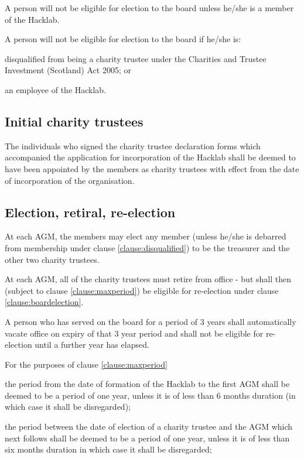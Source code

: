 \documentclass{article}
\newcommand{\charityact}{Charities and Trustee Investment (Scotland) Act 2005}
\begin{document}
\clause A person will not be eligible for election to the board unless
he/she is a member of the Hacklab.

\clause A person will not be eligible for election to the board if
he/she is:

\subclause disqualified from being a charity trustee under the
\charityact; or

\subclause an employee of the Hacklab.

\subsection{Initial charity trustees}

\clause The individuals who signed the charity trustee declaration
forms which accompanied the application for incorporation of the
Hacklab shall be deemed to have been appointed by the members as
charity trustees with effect from the date of incorporation of the
organisation. 

\subsection{Election, retiral, re-election}

\clause\label{clause:boardelection}At each AGM, the members may elect
any member (unless he/she is debarred from membership under clause
\ref{clause:disqualified}) to be the treasurer and the other two
charity trustees.

\clause At each AGM, all of the charity trustees must retire from
office - but shall then (subject to clause \ref{clause:maxperiod}) be
eligible for re-election under clause \ref{clause:boardelection}.

\clause\label{clause:maxperiod} A person who has served on the board
for a period of 3 years shall automatically vacate office on expiry of
that 3 year period and shall not be eligible for re-election until a
further year has elapsed.

\clause For the purposes of clause \ref{clause:maxperiod}

\subclause the period from the date of formation of the Hacklab to the
first AGM shall be deemed to be a period of one year, unless it is of
less than 6 months duration (in which case it shall be disregarded);

\subclause the period between the date of election of a charity
trustee and the AGM which next follows shall be deemed to be a period
of one year, unless it is of less than six months duration in which
case it shall be disregarded; 
\end{document}
